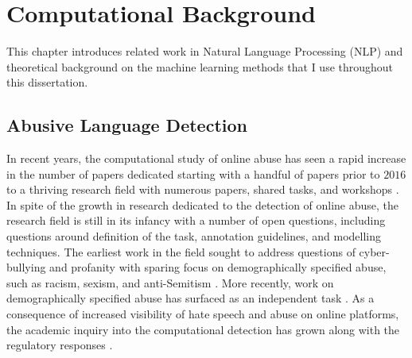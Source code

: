 \chapter{Computational Background}\label{chap:nlp}

\ifpdf
    \graphicspath{{Chapter3/Figs/Raster/}{Chapter3/Figs/PDF/}{Chapter3/Figs/}}
\else
    \graphicspath{{Chapter3/Figs/Vector/}{Chapter3/Figs/}}
\fi

This chapter introduces related work in Natural Language Processing (NLP) and theoretical background on the machine learning methods that I use throughout this dissertation.

\section{Abusive Language Detection}\label{sec:abuse}

In recent years, the computational study of online abuse has seen a rapid increase in the number of papers dedicated starting with a handful of papers prior to $2016$ to a thriving research field with numerous papers, shared tasks, and workshops \citep{Vidgen:2020}. 
In spite of the growth in research dedicated to the detection of online abuse, the research field is still in its infancy with a number of open questions, including questions around definition of the task, annotation guidelines, and modelling techniques.
The earliest work in the field sought to address questions of cyber-bullying \citep{Chen:2012,Cho:2013,Reynolds:2011} and profanity \citep{Sood:profanity:2012,Sood:2013} with sparing focus on demographically specified abuse, such as racism, sexism, and anti-Semitism \citep{Warner:2012}. 
More recently, work on demographically specified abuse has surfaced as an independent task \citep{Tulkens:2015,Waseem:2016,Waseem-Hovy:2016,Park:2017,Samghabadi:2017,Karan:2018,Gorrell:2018,Stoop:2019,Meyer:2019,Palmer:2020,Vidgen:2020}. 
As a consequence of increased visibility of hate speech and abuse on online platforms, the academic inquiry into the computational detection has grown along with the regulatory responses \citep{NetzDG:2017,EUCommission:2016}.

